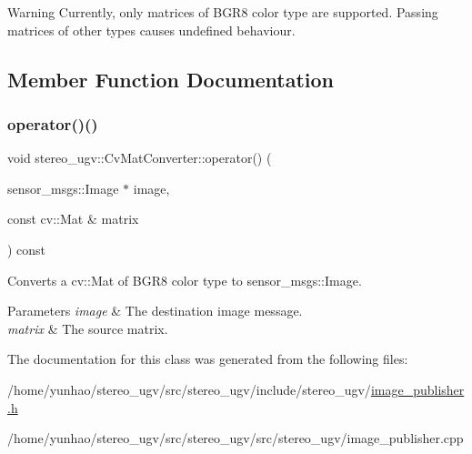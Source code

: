 \begin{DoxyWarning}{Warning}
Currently, only matrices of B\+G\+R8 color type are supported. Passing matrices of other types causes undefined behaviour. 
\end{DoxyWarning}


\subsection{Member Function Documentation}
\mbox{\label{classstereo__ugv_1_1CvMatConverter_ad637bfe9ffdf0a07332e516d1aeafe29}} 
\subsubsection{\texorpdfstring{operator()()}{operator()()}}
{\footnotesize\ttfamily void stereo\+\_\+ugv\+::\+Cv\+Mat\+Converter\+::operator() (\begin{DoxyParamCaption}\item[{sensor\+\_\+msgs\+::\+Image $\ast$}]{image,  }\item[{const cv\+::\+Mat \&}]{matrix }\end{DoxyParamCaption}) const}



Converts a cv\+::\+Mat of B\+G\+R8 color type to sensor\+\_\+msgs\+::\+Image. 


\begin{DoxyParams}{Parameters}
{\em image} & The destination image message. \\
\hline
{\em matrix} & The source matrix. \\
\hline
\end{DoxyParams}


The documentation for this class was generated from the following files\+:\begin{DoxyCompactItemize}
\item 
/home/yunhao/stereo\+\_\+ugv/src/stereo\+\_\+ugv/include/stereo\+\_\+ugv/\hyperlink{image__publisher_8h}{image\+\_\+publisher.\+h}\item 
/home/yunhao/stereo\+\_\+ugv/src/stereo\+\_\+ugv/src/stereo\+\_\+ugv/image\+\_\+publisher.\+cpp\end{DoxyCompactItemize}
